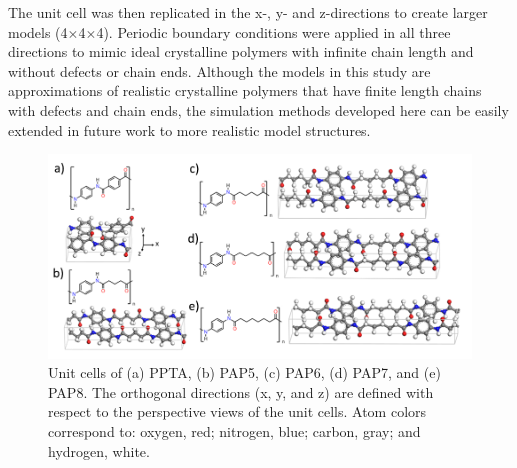 \documentclass[journal=langd5,manuscript=article]{achemso}
\begin{document}

The unit cell was then replicated in the x-, y- and z-directions to create larger models (4$\times$4$\times$4).
Periodic boundary conditions were applied in all three directions to mimic ideal crystalline polymers with infinite chain length and without defects or chain ends.
Although the models in this study are approximations of realistic crystalline polymers that have finite length chains with defects and chain ends, the simulation methods developed here can be easily extended in future work to more realistic model structures.

\begin{figure}[ht]
\centering
\includegraphics[scale=0.5]{Models.png}
\caption{Unit cells of (a) PPTA, (b) PAP5, (c) PAP6, (d) PAP7, and (e) PAP8. The orthogonal directions (x, y, and z) are defined with respect to the perspective views of the unit cells. Atom colors correspond to: oxygen, red; nitrogen, blue; carbon, gray; and hydrogen, white.}
\label{fig:model}
\end{figure} 
\end{document}
